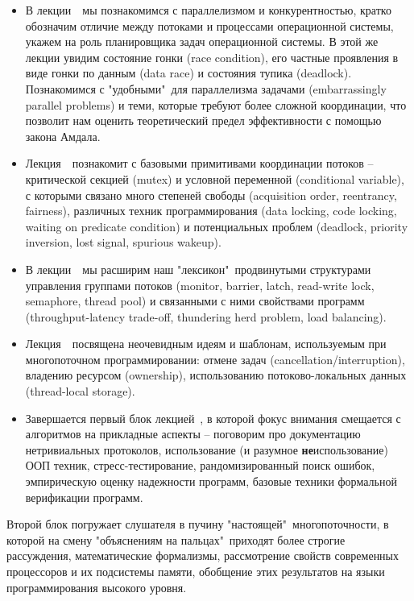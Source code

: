 \documentclass[a4paper, 12pt]{extarticle}
\begin{document}
\begin{itemize}

\item В лекции~\introNum~мы познакомимся с параллелизмом и конкурентностью, кратко обозначим отличие между потоками и процессами операционной системы, укажем на роль планировщика задач операционной системы. В этой же лекции увидим состояние гонки (race condition), его частные проявления в виде гонки по данным (data race) и состояния тупика (deadlock). Познакомимся с "удобными"\ для параллелизма задачами (embarrassingly parallel problems) и теми, которые требуют более сложной координации, что позволит нам оценить теоретический предел эффективности с помощью закона Амдала. 

\item Лекция~\basicNum~познакомит с базовыми примитивами координации потоков -- критической секцией (mutex) и условной переменной (conditional variable), с которыми связано много степеней свободы (acquisition order, reentrancy, fairness), различных техник программирования (data locking, code locking, waiting on predicate condition) и потенциальных проблем (deadlock, priority inversion, lost signal, spurious wakeup). 

\item В лекции~\syncPrimitivesNum~мы расширим наш "лексикон"\ продвинутыми структурами управления группами потоков (monitor, barrier, latch, read-write lock, semaphore, thread pool) и связанными с ними свойствами программ (throughput-latency trade-off, thundering herd problem, load balancing). 

\item Лекция~\patternsNum~посвящена неочевидным идеям и шаблонам, используемым при многопоточном программировании: отмене задач (cancellation/interruption), владению ресурсом (ownership), использованию потоково-локальных данных (thread-local storage).

\item Завершается первый блок лекцией~\extraBasicsNum, в которой фокус внимания смещается с алгоритмов на прикладные аспекты -- поговорим про документацию нетривиальных протоколов, использование (и разумное \textbf{не}использование) ООП техник, стресс-тестирование, рандомизированный поиск ошибок, эмпирическую оценку надежности программ, базовые техники формальной верификации программ.

\end{itemize}

Второй блок погружает слушателя в пучину "настоящей"\ многопоточности, в которой на смену "объяснениям на пальцах"\ приходят более строгие рассуждения, математические формализмы, рассмотрение свойств современных процессоров и их подсистемы памяти, обобщение этих результатов на языки программирования высокого уровня.
\end{document}
